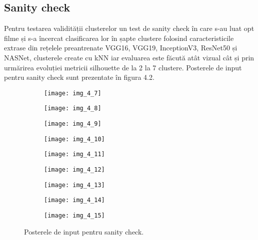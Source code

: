 \subsection{Sanity check}
Pentru testarea validității clusterelor un test de sanity check în care s-au luat opt filme și s-a încercat clasificarea lor în șapte clustere folosind caracteristicile extrase din rețelele preantrenate VGG16, VGG19, InceptionV3, ResNet50 și NASNet, clusterele create cu kNN iar evaluarea este făcută atât vizual cât și prin urmărirea evoluției metricii silhouette de la 2 la 7 clustere. Posterele de input pentru sanity check sunt prezentate în figura 4.2.
\begin{figure}[!h]
  \centering
  \begin{subfigure}[b]{0.48\textwidth}
    \texttt{[image: img\_4\_7]}
  \end{subfigure}
  \hfill
  \begin{subfigure}[b]{0.48\textwidth}
    \texttt{[image: img\_4\_8]}
  \end{subfigure}
    \hfill
  \begin{subfigure}[b]{0.48\textwidth}
    \texttt{[image: img\_4\_9]}
  \end{subfigure}
  \hfill
  \begin{subfigure}[b]{0.48\textwidth}
    \texttt{[image: img\_4\_10]}
  \end{subfigure}
  \hfill
  \begin{subfigure}[b]{0.48\textwidth}
    \texttt{[image: img\_4\_11]}
  \end{subfigure}
  \hfill
  \begin{subfigure}[b]{0.48\textwidth}
    \texttt{[image: img\_4\_12]}
  \end{subfigure}
    \hfill
  \begin{subfigure}[b]{0.48\textwidth}
    \texttt{[image: img\_4\_13]}
  \end{subfigure}
    \hfill
  \begin{subfigure}[b]{0.48\textwidth}
    \texttt{[image: img\_4\_14]}
  \end{subfigure}
      \hfill
  \begin{subfigure}[b]{0.3\textwidth}
    \texttt{[image: img\_4\_15]}
  \end{subfigure}
  \caption[Postere input sanity check]{Posterele de input pentru sanity check.}
\end{figure}

